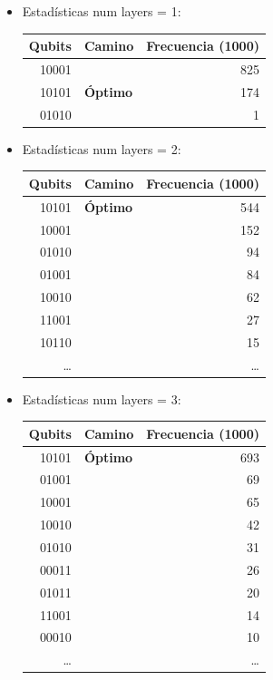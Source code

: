 \documentclass[letterpaper]{article}
\begin{document}
\begin{itemize}
\item Estadísticas num layers = 1:
\begin{center}
\begin{tabular}{|r|l|r|}
\hline
\textbf{Qubits} & \textbf{Camino} & \textbf{Frecuencia (1000)}\\
\hline
10001 &  & 825\\
10101 & \textbf{Óptimo} & 174\\
01010 &  & 1\\
\hline
\end{tabular}
\end{center}

\item Estadísticas num layers = 2:
\begin{center}
\begin{tabular}{|r|l|r|}
\hline
\textbf{Qubits} & \textbf{Camino} & \textbf{Frecuencia (1000)}\\
\hline
10101 & \textbf{Óptimo} & 544\\
10001 &  & 152\\
01010 &  & 94\\
01001 &  & 84\\
10010 &  & 62\\
11001 &  & 27\\
10110 &  & 15\\
\ldots{} &  & \ldots{}\\
\hline
\end{tabular}
\end{center}

\item Estadísticas num layers = 3:
\begin{center}
\begin{tabular}{|r|l|r|}
\hline
\textbf{Qubits} & \textbf{Camino} & \textbf{Frecuencia (1000)}\\
\hline
10101 & \textbf{Óptimo} & 693\\
01001 &  & 69\\
10001 &  & 65\\
10010 &  & 42\\
01010 &  & 31\\
00011 &  & 26\\
01011 &  & 20\\
11001 &  & 14\\
00010 &  & 10\\
\ldots{} &  & \ldots{}\\
\hline
\end{tabular}
\end{center}
\end{itemize}
\newpage
\end{document}

